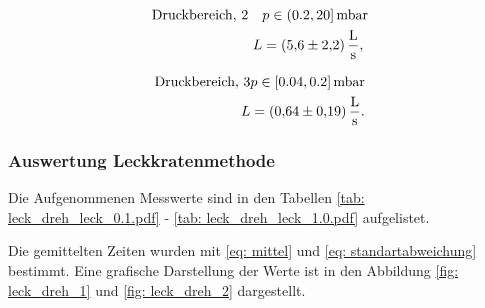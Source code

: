 \begin{align}
  \label{eq:dreh_leit_2}
  \begin{aligned}
  \text{Druckbereich, 2} \quad  &p\in(0.2,20]\,\si{\milli\bar} \\
   L&=\SI{5.6\pm 2.2}{\litre\per\second},
\end{aligned}
\end{align}

\begin{align}
  \label{eq:dreh_leit_3}
  \begin{aligned}
  \text{Druckbereich, 3} &p\in[0.04,0.2]\,\si{\milli\bar} \\
   L&=\SI{0.64\pm 0.19}{\litre\per\second}.
\end{aligned}
\end{align}

\subsubsection{Auswertung Leckkratenmethode}

Die Aufgenommenen Messwerte sind in den Tabellen \ref{tab: leck_dreh_leck_0.1.pdf} - \ref{tab: leck_dreh_leck_1.0.pdf} aufgelistet.





Die gemittelten Zeiten wurden mit \eqref{eq: mittel} und \eqref{eq: standartabweichung} bestimmt. %
Eine grafische Darstellung der Werte ist in den Abbildung \ref{fig: leck_dreh_1} und \ref{fig: leck_dreh_2} dargestellt. %

